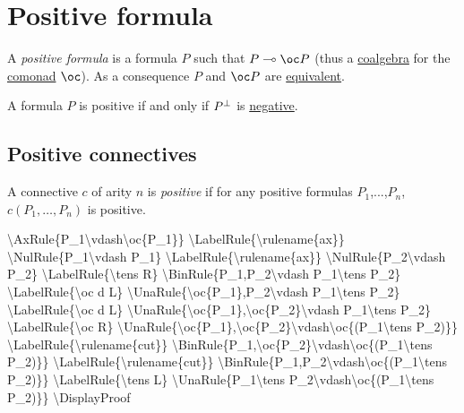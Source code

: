 \section{Positive formula}\label{positive-formula}

A \emph{positive formula} is a formula \(P\) such that \(P\limp\oc P\)
(thus a \href{Wikipedia:F-coalgebra}{coalgebra} for the
\href{Wikipedia:Comonad}{comonad} \(\oc\)). As a consequence \(P\) and
\(\oc P\) are \href{Sequent_calculus\#Equivalences}{equivalent}.

A formula \(P\) is positive if and only if \(P^\bot\) is
\href{Negative_formula}{negative}.

\subsection{Positive connectives}\label{positive-connectives}

A connective \(c\) of arity \(n\) is \emph{positive} if for any positive
formulas \(P_1\),...,\(P_n\), \(c(P_1,\dots,P_n)\) is positive.

\textbackslash{}AxRule\{P\_1\textbackslash{}vdash\textbackslash{}oc\{P\_1\}\}
\textbackslash{}LabelRule\{\textbackslash{}rulename\{ax\}\}
\textbackslash{}NulRule\{P\_1\textbackslash{}vdash P\_1\}
\textbackslash{}LabelRule\{\textbackslash{}rulename\{ax\}\}
\textbackslash{}NulRule\{P\_2\textbackslash{}vdash P\_2\}
\textbackslash{}LabelRule\{\textbackslash{}tens R\}
\textbackslash{}BinRule\{P\_1,P\_2\textbackslash{}vdash
P\_1\textbackslash{}tens P\_2\}
\textbackslash{}LabelRule\{\textbackslash{}oc d L\}
\textbackslash{}UnaRule\{\textbackslash{}oc\{P\_1\},P\_2\textbackslash{}vdash
P\_1\textbackslash{}tens P\_2\}
\textbackslash{}LabelRule\{\textbackslash{}oc d L\}
\textbackslash{}UnaRule\{\textbackslash{}oc\{P\_1\},\textbackslash{}oc\{P\_2\}\textbackslash{}vdash
P\_1\textbackslash{}tens P\_2\}
\textbackslash{}LabelRule\{\textbackslash{}oc R\}
\textbackslash{}UnaRule\{\textbackslash{}oc\{P\_1\},\textbackslash{}oc\{P\_2\}\textbackslash{}vdash\textbackslash{}oc\{(P\_1\textbackslash{}tens
P\_2)\}\} \textbackslash{}LabelRule\{\textbackslash{}rulename\{cut\}\}
\textbackslash{}BinRule\{P\_1,\textbackslash{}oc\{P\_2\}\textbackslash{}vdash\textbackslash{}oc\{(P\_1\textbackslash{}tens
P\_2)\}\} \textbackslash{}LabelRule\{\textbackslash{}rulename\{cut\}\}
\textbackslash{}BinRule\{P\_1,P\_2\textbackslash{}vdash\textbackslash{}oc\{(P\_1\textbackslash{}tens
P\_2)\}\} \textbackslash{}LabelRule\{\textbackslash{}tens L\}
\textbackslash{}UnaRule\{P\_1\textbackslash{}tens
P\_2\textbackslash{}vdash\textbackslash{}oc\{(P\_1\textbackslash{}tens
P\_2)\}\} \textbackslash{}DisplayProof


